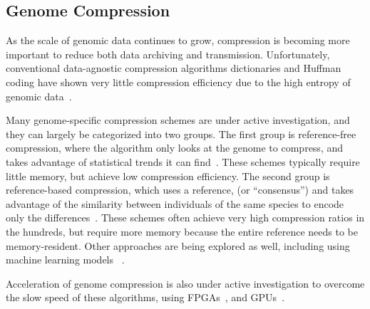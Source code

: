 \subsection{Genome Compression}

As the scale of genomic data continues to grow, compression is becoming more important to reduce both data archiving and transmission.
Unfortunately, conventional data-agnostic compression algorithms dictionaries and Huffman coding have shown very little compression efficiency due to the high entropy of genomic data~\cite{kokot2022colord,mansouri2020newdnacompression}.

Many genome-specific compression schemes are under active investigation, and they can largely be categorized into two groups.
The first group is reference-free compression, where the algorithm only looks at the genome to compress, and takes advantage of statistical trends it can find~\cite{chandak2018spring,kokot2022colord}.
These schemes typically require little memory, but achieve low compression efficiency.
The second group is reference-based compression, which uses a reference, (or ``consensus'') and takes advantage of the similarity between individuals of the same species to encode only the differences~\cite{bonfield2022cram,kokot2022colord}.
These schemes often achieve very high compression ratios in the hundreds, but require more memory because the entire reference needs to be memory-resident.
Other approaches are being explored as well, including using machine learning models ~\cite{silva2020efficientdnann,cui2020compressinggenomedeep,sheena2024gencoder}.

Acceleration of genome compression is also under active investigation to overcome the slow speed of these algorithms, using FPGAs~\cite{arram2015fpgareferencecompressiongenomic,chen2023efficientsequencingcompressionfpga}, and GPUs~\cite{guo2013gpu,amich2020gpu,deluca2022gpu}.
